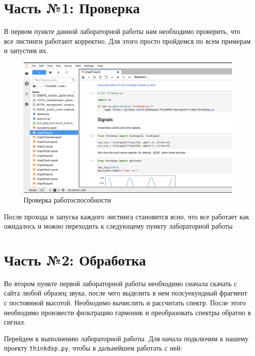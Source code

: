 \documentclass[a4paper]{article}
\begin{document}
    \newpage
        \section{Часть №1: Проверка}
        
            В первом пункте данной лабораторной работы нам необходимо проверить, что все листинги работают корректно. Для этого просто пройдемся по всем примерам и запустим их.
            
            \begin{figure}[h]
                \centering
                \includegraphics[width=\textwidth]{Screen_check.png}
                \caption{Проверка работоспособности}
                \label{fig:check_it_works}
            \end{figure}
            
            После прохода и запуска каждого листинга становится ясно, что все работает как ожидалось и можно переходить к следующему пункту лабораторной работы
    
    \newpage
        \section{Часть №2: Обработка}
            
            Во втором пункте первой лабораторной работы необходимо сначала скачать с сайта любой образец звука, после чего выделить в нем полсуекундный фрагмент с постоянной высотой. Необходимо вычислить и рассчитать спектр. После этого необходимо произвести фильтрацию гармоник и преобразовать спектры обратно в сигнал.
            
            Перейдем к выполнению лабораторной работы. Для начала подключим к нашему проекту \texttt{thinkdsp.py}, чтобы в дальнейшем работать с ней:
            
\end{document}
